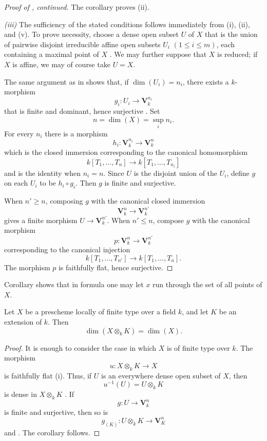 \begin{proof}[Proof of , continued]
The corollary proves (ii).

\emph{(iii)} The sufficiency of the stated conditions follows immediately from (i), (ii), and (v).
To prove necessity, choose a dense open subset $U$ of $X$ that is the union of pairwise disjoint irreducible affine open subsets $U_i$ $(1\leq i\leq m)$, each containing a maximal point of $X$ .
We may further suppose that $X$ is reduced; if $X$ is affine, we may of course take $U=X$.


The same argument as in  shows that, if $\dim(U_i)=n_i$, there exists a $k$-morphism
\[
g_i:U_i\longrightarrow\mathbf{V}_k^{n_i}
\]
that is finite and dominant, hence surjective .
Set
\[
n=\dim(X)=\sup_i n_i.
\]
For every $n_i$ there is a morphism
\[
h_i:\mathbf{V}_k^{n_i}\longrightarrow\mathbf{V}_k^n
\]
which is the closed immersion corresponding to the canonical homomorphism
\[
k[T_1,\ldots,T_n]\longrightarrow k[T_1,\ldots,T_{n_i}]
\]
and is the identity when $n_i=n$.
Since $U$ is the disjoint union of the $U_i$, define $g$ on each $U_i$ to be $h_i\circ g_i$.
Then $g$ is finite and surjective.

When $n'\geq n$, composing $g$ with the canonical closed immersion
\[
\mathbf{V}_k^n\longrightarrow\mathbf{V}_k^{n'}
\]
gives a finite morphism $U\to\mathbf{V}_k^{n'}$.
When $n'\leq n$, compose $g$ with the canonical morphism
\[
p:\mathbf{V}_k^n\longrightarrow\mathbf{V}_k^{n'}
\]
corresponding to the canonical injection
\[
k[T_1,\ldots,T_{n'}]\longrightarrow k[T_1,\ldots,T_n].
\]
The morphism $p$ is faithfully flat, hence surjective.
\end{proof}

\begin{remark}[4.1.3]
\label{IV.4.1.3}
Corollary  shows that in formula  one may let $x$ run through the set of all points of $X$.
\end{remark}

\begin{corollary}[4.1.4]
\label{IV.4.1.4}
Let $X$ be a prescheme locally of finite type over a field $k$, and let $K$ be an extension of $k$.
Then
\[
\dim(X\otimes_k K)=\dim(X).
\]
\end{corollary}

\begin{proof}
It is enough to consider the case in which $X$ is of finite type over $k$.
The morphism
\[
u:X\otimes_k K\longrightarrow X
\]
is faithfully flat (i).
Thus, if $U$ is an everywhere dense open subset of $X$, then
\[
u^{-1}(U)=U\otimes_k K
\]
is dense in $X\otimes_k K$ .
If
\[
g:U\longrightarrow\mathbf{V}_k^n
\]
is finite and surjective, then so is
\[
g_{(K)}:U\otimes_k K\longrightarrow\mathbf{V}_K^n
\]
 and .
The corollary follows.
\end{proof}

